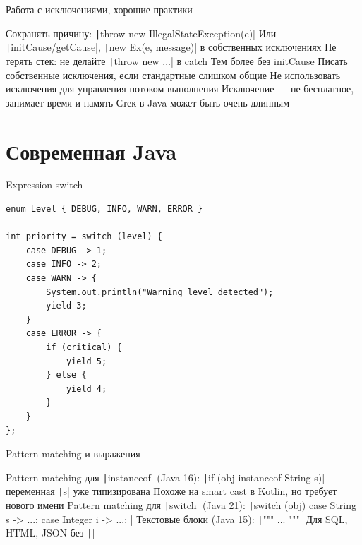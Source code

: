 \documentclass{../../slides-style}
\begin{document}
    \begin{frame}{Работа с исключениями, хорошие практики}
        \begin{outline}
            \1 Сохранять причину: \texttt|throw new IllegalStateException(e)|
                \2 Или \texttt|initCause/getCause|, \texttt|new Ex(e, message)| в собственных исключениях
            \1 Не терять стек: не делайте \texttt|throw new ...| в catch
                \2 Тем более без initCause
            \1 Писать собственные исключения, если стандартные слишком общие
            \1 Не использовать исключения для управления потоком выполнения
            \1 Исключение --- не бесплатное, занимает время и память
                \2 Стек в Java может быть очень длинным
        \end{outline}
    \end{frame}

    \section{Современная Java}

    \begin{frame}[fragile]{Expression switch}
        \begin{small}
            \begin{verbatim}
enum Level { DEBUG, INFO, WARN, ERROR }

int priority = switch (level) {
    case DEBUG -> 1;
    case INFO -> 2;
    case WARN -> {
        System.out.println("Warning level detected");
        yield 3;
    }
    case ERROR -> {
        if (critical) {
            yield 5;
        } else {
            yield 4;
        }
    }
};
            \end{verbatim}
        \end{small}
    \end{frame}

    \begin{frame}{Pattern matching и выражения}
        \begin{outline}
            \1 Pattern matching для \texttt|instanceof| (Java 16):
                \2 \texttt|if (obj instanceof String s)| --- переменная \texttt|s| уже типизирована
                \2 Похоже на smart cast в Kotlin, но требует нового имени
            \1 Pattern matching для \texttt|switch| (Java 21):
                \2 \texttt|switch (obj) { case String s -> ...; case Integer i -> ...; }|
            \1 Текстовые блоки (Java 15): \texttt|""" ... """| 
                \2 Для SQL, HTML, JSON без \texttt|\n|
        \end{outline}
    \end{frame}
\end{document}
